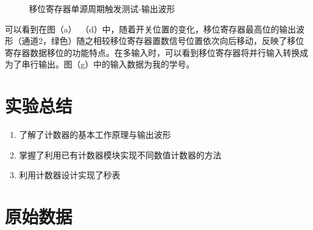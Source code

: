 \documentclass[UTF8]{ctexart}
\numberwithin{figure}{subsection}
\numberwithin{table}{subsection}
\numberwithin{equation}{subsection}
\begin{document}
\begin{figure}[H]
    \caption{移位寄存器单源周期触发测试-输出波形}
    \label{1S-V2 osci}
\end{figure}
可以看到在图（a）~（d）中，随着开关位置的变化，移位寄存器最高位的输出波形（通道2，绿色）随之相较移位寄存器置数信号位置依次向后移动，反映了移位寄存器数据移位的功能特点。在多输入时，可以看到移位寄存器将并行输入转换成为了串行输出。图（g）中的输入数据为我的学号。




\section{实验总结}
\begin{enumerate}
    \item 了解了计数器的基本工作原理与输出波形
    \item 掌握了利用已有计数器模块实现不同数值计数器的方法
    \item 利用计数器设计实现了秒表
\end{enumerate}

\section*{原始数据}
\end{document}
